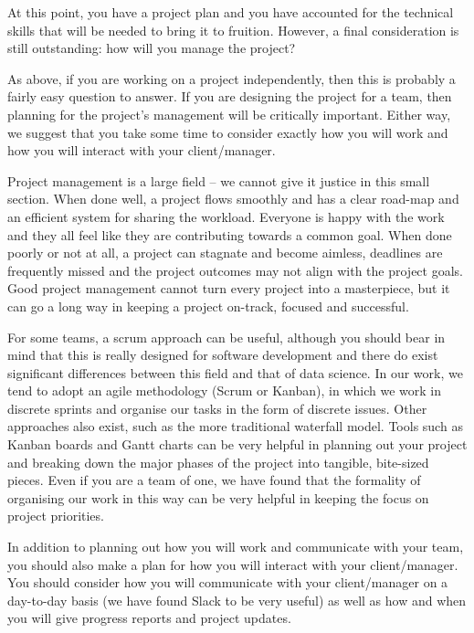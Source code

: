 \documentclass[
]{book}
\begin{document}
At this point, you have a project plan and you have accounted for the technical skills that will be needed to bring it to fruition. However, a final consideration is still outstanding: how will you manage the project?

As above, if you are working on a project independently, then this is probably a fairly easy question to answer. If you are designing the project for a team, then planning for the project's management will be critically important. Either way, we suggest that you take some time to consider exactly how you will work and how you will interact with your client/manager.

Project management is a large field -- we cannot give it justice in this small section. When done well, a project flows smoothly and has a clear road-map and an efficient system for sharing the workload. Everyone is happy with the work and they all feel like they are contributing towards a common goal. When done poorly or not at all, a project can stagnate and become aimless, deadlines are frequently missed and the project outcomes may not align with the project goals. Good project management cannot turn every project into a masterpiece, but it can go a long way in keeping a project on-track, focused and successful.

For some teams, a scrum approach can be useful, although you should bear in mind that this is really designed for software development and there do exist significant differences between this field and that of data science. In our work, we tend to adopt an agile methodology (Scrum or Kanban), in which we work in discrete sprints and organise our tasks in the form of discrete issues. Other approaches also exist, such as the more traditional waterfall model. Tools such as Kanban boards and Gantt charts can be very helpful in planning out your project and breaking down the major phases of the project into tangible, bite-sized pieces. Even if you are a team of one, we have found that the formality of organising our work in this way can be very helpful in keeping the focus on project priorities.

In addition to planning out how you will work and communicate with your team, you should also make a plan for how you will interact with your client/manager. You should consider how you will communicate with your client/manager on a day-to-day basis (we have found Slack to be very useful) as well as how and when you will give progress reports and project updates.
\end{document}
